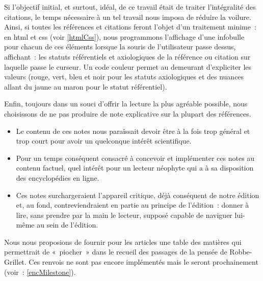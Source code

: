 \documentclass[12pt, a4paper]{article}
\begin{document}
Si l'objectif initial, et surtout, idéal, de ce travail était de traiter l'intégralité des citations, le temps nécessaire à un tel travail nous imposa de réduire la voilure.
Ainsi, si toutes les références et citations feront l'objet d'un traitement minime~: en html et css (voir \ref{htmlCss}), nous programmons l'affichage d'une infobulle pour chacun de ces éléments lorsque la souris de l'utilisateur passe dessus, affichant~: les statuts référentiels et axiologiques de la référence ou citation sur laquelle passe le curseur. Un code couleur permet au demeurant d'expliciter les valeurs (rouge, vert, bleu et noir pour les statuts axiologiques et des nuances allant du jaune au maron pour le statut référentiel).


Enfin, toujours dans un souci d'offrir la lecture la plus agréable possible, nous choisissons de ne pas produire de note explicative sur la plupart des références.
\begin{itemize}
    \item Le contenu de ces notes nous paraîssait devoir être à la fois trop général et trop court pour avoir un quelconque intérêt scientifique.
    \item Pour un temps conséquent consacré à concevoir et implémenter ces notes au contenu factuel, quel intérêt pour un lecteur néophyte qui a à sa disposition des encyclopédies en ligne.
    \item Ces notes surchargeraient l'appareil critique, déjà conséquent de notre édition et, au fond, contreviendraient en partie au principe de l'édition~: donner à lire, sans prendre par la main le lecteur, supposé capable de naviguer lui-même au sein de l'édition.
\end{itemize}





Nous nous proposions de fournir pour les articles une table des matières qui permettrait de «~piocher~» dans le recueil des passages de la pensée de Robbe-Grillet. Ces renvois ne sont pas encore implémentés mais le seront prochainement (voir~: \ref{encMilestone}).
\end{document}
